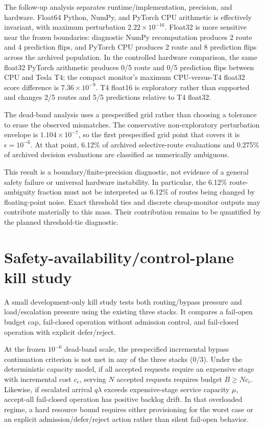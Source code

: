 \documentclass[11pt]{article}
\begin{document}
The follow-up analysis separates runtime/implementation, precision, and hardware. Float64 Python, NumPy, and PyTorch CPU arithmetic is effectively invariant, with maximum perturbation $2.22\times10^{-16}$. Float32 is more sensitive near the frozen boundaries: diagnostic NumPy recomputation produces 2 route and 4 prediction flips, and PyTorch CPU produces 2 route and 8 prediction flips across the archived population. In the controlled hardware comparison, the same float32 PyTorch arithmetic produces 0/5 route and 0/5 prediction flips between CPU and Tesla T4; the compact monitor's maximum CPU-versus-T4 float32 score difference is $7.36\times10^{-9}$. T4 float16 is exploratory rather than supported and changes 2/5 routes and 5/5 predictions relative to T4 float32.

The dead-band analysis uses a prespecified grid rather than choosing a tolerance to erase the observed mismatches. The conservative non-exploratory perturbation envelope is $1.104\times10^{-7}$, so the first prespecified grid point that covers it is $\epsilon=10^{-6}$. At that point, 6.12\% of archived selective-route evaluations and 0.275\% of archived decision evaluations are classified as numerically ambiguous.

This result is a boundary/finite-precision diagnostic, not evidence of a general safety failure or universal hardware instability. In particular, the 6.12\% route-ambiguity fraction must not be interpreted as 6.12\% of routes being changed by floating-point noise. Exact threshold ties and discrete cheap-monitor outputs may contribute materially to this mass. Their contribution remains to be quantified by the planned threshold-tie diagnostic.

\section{Safety-availability/control-plane kill study}
A small development-only kill study tests both routing/bypass pressure and load/escalation pressure using the existing three stacks. It compares a fail-open budget cap, fail-closed operation without admission control, and fail-closed operation with explicit defer/reject.

At the frozen $10^{-6}$ dead-band scale, the prespecified incremental bypass continuation criterion is not met in any of the three stacks (0/3). Under the deterministic capacity model, if all accepted requests require an expensive stage with incremental cost $c_e$, serving $N$ accepted requests requires budget $B\geq N c_e$. Likewise, if escalated arrival $q\lambda$ exceeds expensive-stage service capacity $\mu$, accept-all fail-closed operation has positive backlog drift. In that overloaded regime, a hard resource bound requires either provisioning for the worst case or an explicit admission/defer/reject action rather than silent fail-open behavior.
\end{document}
